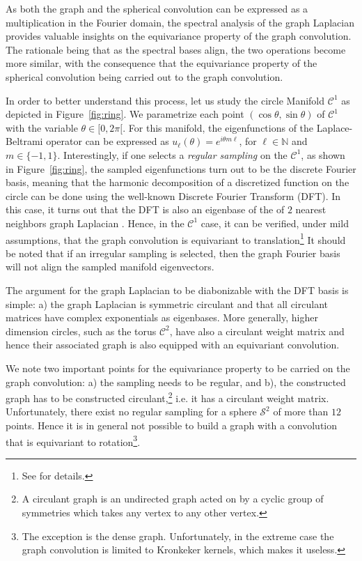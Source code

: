 \documentclass{article} %
\newcommand{\figref}[1]{Figure~\ref{fig:#1}}
\newcommand{\1}{\b{1}}              %
\newcommand{\0}{\b{0}}              %
\newcommand{\todo}[1]{{\color[rgb]{.6,.1,.6}{#1}}}
\begin{document}

As both the graph and the spherical convolution can be expressed as a multiplication in the Fourier domain, the spectral analysis of the graph Laplacian provides valuable insights on the equivariance property of the graph convolution. 
The rationale being that as the spectral bases align, the two operations become more similar, with the consequence that the equivariance property of the spherical convolution being carried out to the graph convolution. 



In order to better understand this process, let us study the circle Manifold $\mathcal{C}^1$ as depicted in \figref{ring}. We parametrize each point $(\cos\theta,\sin\theta)$ of $\mathcal{C}^1$ with the variable $\theta\in[0,2\pi[$.
For this manifold, the eigenfunctions of the Laplace-Beltrami operator can be expressed as $u_\ell(\theta)=e^{i \theta m \ell}$, for $\ell \in \mathbb{N}$ and $m\in\{-1,1\}$. 
Interestingly, if one selects a \emph{regular sampling} on the $\mathcal{C}^1$, as shown in \figref{ring}, the sampled eigenfunctions turn out to be the discrete Fourier basis, meaning that the harmonic decomposition of a discretized function on the circle can be done using the well-known Discrete Fourier Transform (DFT). 
In this case, it turns out that the DFT is also an eigenbase of the of $2$ nearest neighbors graph Laplacian \cite{strang1999discrete}. Hence, in the $\mathcal{C}^1$ case, it can be verified, under mild assumptions, that the graph convolution is equivariant to translation\footnote{See \cite[section 2.2 and Equation3]{perraudin2017stationary} for details.}  
It should be noted that if an irregular sampling is selected, then the graph Fourier basis will not align the sampled manifold eigenvectors. 


The argument for the graph Laplacian to be diabonizable with the DFT basis is simple: a) the graph Laplacian is symmetric circulant and that all circulant matrices have complex exponentials as eigenbases. 
More generally, higher dimension circles, such as the torus $\mathcal{C}^2$, have also a circulant weight matrix and hence their associated graph is also equipped with an equivariant convolution.

We note two important points for the equivariance property to be carried on the graph convolution: a) the sampling needs to be regular, and b), the constructed graph has to be constructed circulant,\footnote{A circulant graph is an undirected graph acted on by a cyclic group of symmetries which takes any vertex to any other vertex.} i.e. it has a circulant weight matrix.
Unfortunately, there exist no regular sampling for a sphere $\mathcal{S}^2$ of more than $12$ points. Hence it is in general not possible to build a graph with a convolution that is equivariant to rotation\footnote{The exception is the dense graph. Unfortunately, in the extreme case the graph convolution is limited to Kronkeker kernels, which makes it useless.}. 
\end{document}
